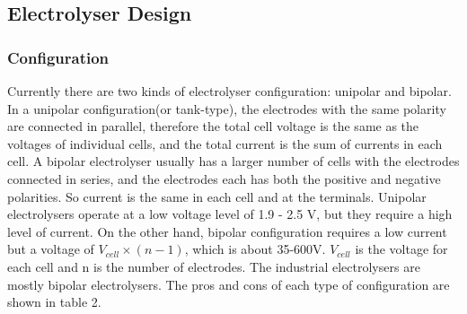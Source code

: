 

\subsection{Electrolyser Design} 


\subsubsection{Configuration} 
Currently there are two kinds of electrolyser configuration: unipolar and bipolar. In a unipolar configuration(or tank-type), the electrodes with the same polarity are connected in parallel, therefore the total cell voltage is the same as the voltages of individual cells, and the total current is the sum of currents in each cell. A bipolar electrolyser usually has a larger number of cells with the electrodes connected in series, and the electrodes each has both the positive and negative polarities. So current is the same in each cell and at the terminals. Unipolar electrolysers operate at a low voltage level of 1.9 - 2.5 V, but they require a high level of current. On the other hand, bipolar configuration requires a low current but a voltage of $V_{cell} \times (n-1)$, which is about 35-600V. $V_{cell}$ is the voltage for each cell and n is the number of electrodes. The industrial electrolysers are mostly bipolar electrolysers.
The pros and cons of each type of configuration are shown in table 2.

